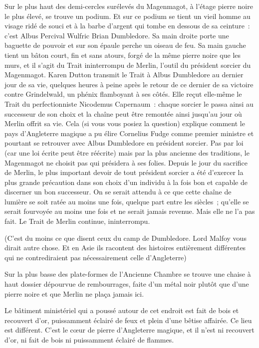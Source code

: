 Sur le plus haut des demi-cercles surélevés du Magenmagot, à l'étage pierre noire le plus élevé, se trouve un podium. Et sur ce podium se tient un vieil homme au visage ridé de souci et à la barbe d'argent qui tombe en dessous de sa ceinture~: c'est Albus Percival Wulfric Brian Dumbledore. Sa main droite porte une baguette de pouvoir et sur son épaule perche un oiseau de feu. Sa main gauche tient un bâton court, fin et sans atours, forgé de la même pierre noire que les murs, et il s'agit du Trait ininterrompu de Merlin, l'outil du président sorcier du Magenmagot. Karen Dutton transmit le Trait à Albus Dumbledore au dernier jour de sa vie, quelques heures à peine après le retour de ce dernier de sa victoire contre Grindelwald, un phénix flamboyant à ses côtés. Elle reçut elle-même le Trait du perfectionniste Nicodemus Capernaum~: chaque sorcier le passa ainsi au successeur de son choix et la chaîne peut être remontée ainsi jusqu'au jour où Merlin offrit sa vie. Cela (si vous vous posiez la question) explique comment le pays d'Angleterre magique a pu élire Cornelius Fudge comme premier ministre et pourtant se retrouver avec Albus Dumbledore en président sorcier. Pas par loi (car une loi écrite peut être réécrite) mais par la plus ancienne des traditions, le Magenmagot ne choisit pas qui présidera à ses folies. Depuis le jour du sacrifice de Merlin, le plus important devoir de tout président sorcier a été d'exercer la plus grande précaution dans son choix d'un individu à la fois bon et capable de discerner un bon successeur. On se serait attendu à ce que cette chaîne de lumière se soit ratée au moins une fois, quelque part entre les siècles~; qu'elle se serait fourvoyée au moins une fois et ne serait jamais revenue. Mais elle ne l'a pas fait. Le Trait de Merlin continue, ininterrompu.

(C'est du moins ce que disent ceux du camp de Dumbledore. Lord Malfoy vous dirait autre chose. Et en Asie ils racontent des histoires entièrement différentes qui ne contrediraient pas nécessairement celle d'Angleterre)

Sur la plus basse des plate-formes de l'Ancienne Chambre se trouve une chaise à haut dossier dépourvue de rembourrages, faite d'un métal noir plutôt que d'une pierre noire et que Merlin ne plaça jamais ici.

Le bâtiment ministériel qui a poussé autour de cet endroit est fait de bois et recouvert d'or, puissamment éclairé de feux et plein d'une bêtise affairée. Ce lieu est différent. C'est le cœur de pierre d'Angleterre magique, et il n'est ni recouvert d'or, ni fait de bois ni puissamment éclairé de flammes.

